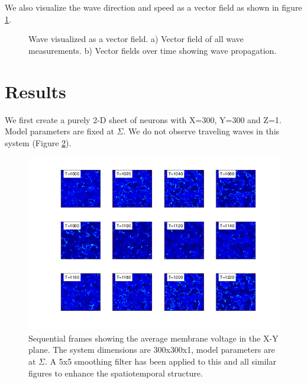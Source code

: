\documentclass[12pt]{article}
\begin{document}
We also visualize the wave direction and speed as a vector field as shown in figure \ref{fig:WavePropQuiver}.
\begin{figure}[!htb]
 \caption{Wave visualized as a vector field.
          a) Vector field of all wave measurements.
          b) Vector fields over time showing wave propagation.
          } 
 \label{fig:WavePropQuiver}
\end{figure}
\FloatBarrier

\section{Results}
We first create a purely 2-D sheet of neurons with X=300, Y=300 and Z=1.
Model parameters are fixed at $\Sigma$.
We do not observe traveling waves in this system (Figure \ref{fig:Pure2DRasters_NoWaves}).
\begin{figure}[!htb]
 \caption{Sequential frames showing the average membrane voltage in the X-Y plane.
          The system dimensions are 300x300x1, model parameters are at $\Sigma$. 
	  A 5x5 smoothing filter has been applied to this and all similar figures to enhance the spatiotemporal structure.}
 \label{fig:Pure2DRasters_NoWaves}
 \centering
   \includegraphics[width=\textwidth]{fig/2D_1LayerNoWaves}
\end{figure}
\FloatBarrier
\end{document}
